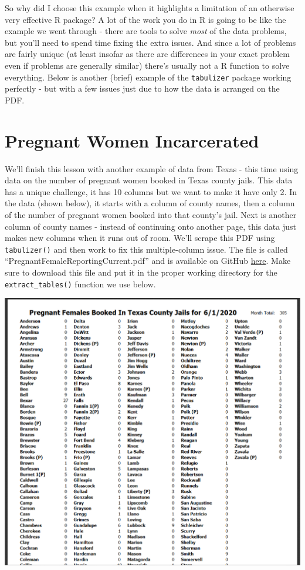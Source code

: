 \documentclass[
  12pt,
]{book}
\begin{document}
So why did I choose this example when it highlights a limitation of an otherwise very effective R package? A lot of the work you do in R is going to be like the example we went through - there are tools to solve \emph{most} of the data problems, but you'll need to spend time fixing the extra issues. And since a lot of problems are fairly unique (at least insofar as there are differences in your exact problem even if problems are generally similar) there's usually not a R function to solve everything. Below is another (brief) example of the \texttt{tabulizer} package working perfectly - but with a few issues just due to how the data is arranged on the PDF.

\hypertarget{pregnant-women-incarcerated}{%
\section{Pregnant Women Incarcerated}\label{pregnant-women-incarcerated}}

We'll finish this lesson with another example of data from Texas - this time using data on the number of pregnant women booked in Texas county jails. This data has a unique challenge, it has 10 columns but we want to make it have only 2. In the data (shown below), it starts with a column of county names, then a column of the number of pregnant women booked into that county's jail. Next is another column of county names - instead of continuing onto another page, this data just makes new columns when it runs out of room. We'll scrape this PDF using \texttt{tabulizer()} and then work to fix this multiple-column issue. The file is called ``PregnantFemaleReportingCurrent.pdf'' and is available on GitHub \href{https://github.com/jacobkap/crimebythenumbers/blob/master/data/PregnantFemaleReportingCurrent.pdf}{here}. Make sure to download this file and put it in the proper working directory for the \texttt{extract\_tables()} function we use below.

\includegraphics{images/pregnant.PNG}
\end{document}
